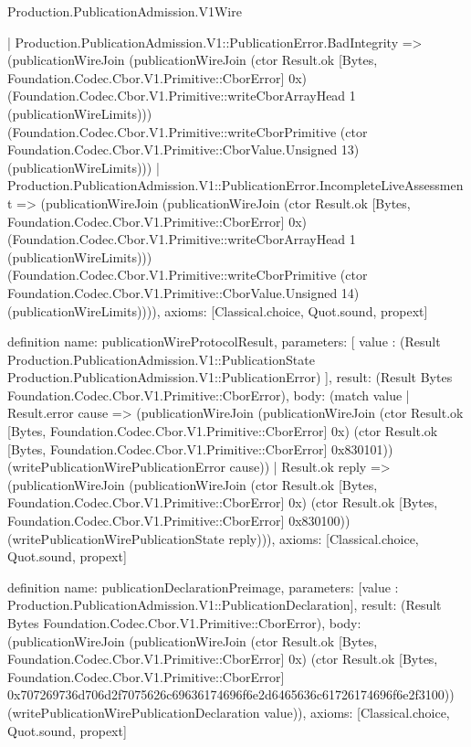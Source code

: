 \begin{lexlean}{Production.PublicationAdmission.V1Wire}
\begin{semanticmodule}
{    | Production.PublicationAdmission.V1::PublicationError.BadIntegrity => (publicationWireJoin (publicationWireJoin (ctor Result.ok [Bytes, Foundation.Codec.Cbor.V1.Primitive::CborError] 0x) (Foundation.Codec.Cbor.V1.Primitive::writeCborArrayHead 1 (publicationWireLimits))) (Foundation.Codec.Cbor.V1.Primitive::writeCborPrimitive (ctor Foundation.Codec.Cbor.V1.Primitive::CborValue.Unsigned 13) (publicationWireLimits)))
    | Production.PublicationAdmission.V1::PublicationError.IncompleteLiveAssessment => (publicationWireJoin (publicationWireJoin (ctor Result.ok [Bytes, Foundation.Codec.Cbor.V1.Primitive::CborError] 0x) (Foundation.Codec.Cbor.V1.Primitive::writeCborArrayHead 1 (publicationWireLimits))) (Foundation.Codec.Cbor.V1.Primitive::writeCborPrimitive (ctor Foundation.Codec.Cbor.V1.Primitive::CborValue.Unsigned 14) (publicationWireLimits)))),
  axioms: [Classical.choice, Quot.sound, propext]
}

definition{
  name: publicationWireProtocolResult,
  parameters: [
    value : (Result Production.PublicationAdmission.V1::PublicationState Production.PublicationAdmission.V1::PublicationError)
  ],
  result: (Result Bytes Foundation.Codec.Cbor.V1.Primitive::CborError),
  body: (match value
    | Result.error cause => (publicationWireJoin (publicationWireJoin (ctor Result.ok [Bytes, Foundation.Codec.Cbor.V1.Primitive::CborError] 0x) (ctor Result.ok [Bytes, Foundation.Codec.Cbor.V1.Primitive::CborError] 0x830101)) (writePublicationWirePublicationError cause))
    | Result.ok reply => (publicationWireJoin (publicationWireJoin (ctor Result.ok [Bytes, Foundation.Codec.Cbor.V1.Primitive::CborError] 0x) (ctor Result.ok [Bytes, Foundation.Codec.Cbor.V1.Primitive::CborError] 0x830100)) (writePublicationWirePublicationState reply))),
  axioms: [Classical.choice, Quot.sound, propext]
}

definition{
  name: publicationDeclarationPreimage,
  parameters: [value : Production.PublicationAdmission.V1::PublicationDeclaration],
  result: (Result Bytes Foundation.Codec.Cbor.V1.Primitive::CborError),
  body: (publicationWireJoin (publicationWireJoin (ctor Result.ok [Bytes, Foundation.Codec.Cbor.V1.Primitive::CborError] 0x) (ctor Result.ok [Bytes, Foundation.Codec.Cbor.V1.Primitive::CborError] 0x707269736d706d2f7075626c69636174696f6e2d6465636c61726174696f6e2f3100)) (writePublicationWirePublicationDeclaration value)),
  axioms: [Classical.choice, Quot.sound, propext]
}


\end{semanticmodule}
\end{lexlean}
